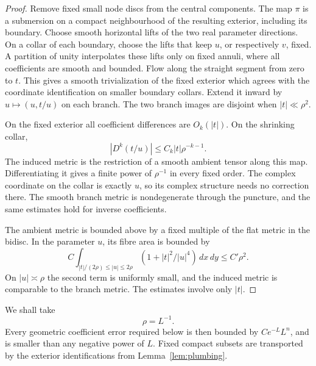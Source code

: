 \begin{proof}
Remove fixed small node discs from the central components. The map
$\pi$ is a submersion on a compact neighbourhood of the resulting
exterior, including its boundary. Choose smooth horizontal lifts
of the two real parameter directions. On a collar of each boundary,
choose the lifts that keep $u$, or respectively $v$, fixed. A partition
of unity interpolates these lifts only on fixed annuli, where all
coefficients are smooth and bounded. Flow along the straight segment
from zero to $t$. This gives a smooth trivialization of the fixed
exterior which agrees with the coordinate identification on smaller
boundary collars. Extend it inward by $u\mapsto(u,t/u)$ on each
branch. The two branch images are disjoint when $|t|\ll\rho^2$.

On the fixed exterior all coefficient differences are $O_k(|t|)$.
On the shrinking collar,
\[
 |D^k(t/u)|\le C_k|t|\rho^{-k-1}.
\]
The induced metric is the restriction of a smooth ambient tensor
along this map. Differentiating it gives a finite power of
$\rho^{-1}$ in every fixed order. The complex coordinate on the
collar is exactly $u$, so its complex structure needs no correction
there. The smooth branch metric is nondegenerate through the
puncture, and the same estimates hold for inverse coefficients.

The ambient metric is bounded above by a fixed multiple of the flat
metric in the bidisc. In the parameter $u$, its fibre area is bounded by
\[
 C\int_{|t|/(2\rho)\le|u|\le2\rho}
       (1+|t|^2/|u|^4)\,dx\,dy\le C'\rho^2.
\]
On $|u|\asymp\rho$ the second term is uniformly small, and the
induced metric is comparable to the branch metric. The estimates
involve only $|t|$.
\end{proof}

We shall take
\begin{equation}\label{eq:cutoff-radius}
 \rho=L^{-1}.
\end{equation}
Every geometric coefficient error required below is then bounded
by $C e^{-L}L^n$, and is smaller than any negative power of $L$.
Fixed compact subsets are transported by the exterior identifications
from Lemma~\ref{lem:plumbing}.

